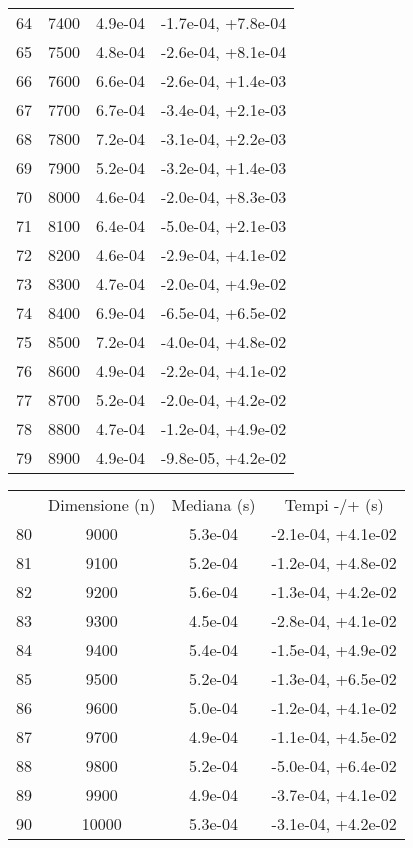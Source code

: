 \begin{table}
\begin{adjustbox}{width=1\textwidth/2}
\begin{tabular}{|c|c|c|c|}
\cline{1-4}
64 & 7400 & 4.9e-04 & -1.7e-04, +7.8e-04 \\
\cline{1-4}
65 & 7500 & 4.8e-04 & -2.6e-04, +8.1e-04 \\
\cline{1-4}
66 & 7600 & 6.6e-04 & -2.6e-04, +1.4e-03 \\
\cline{1-4}
67 & 7700 & 6.7e-04 & -3.4e-04, +2.1e-03 \\
\cline{1-4}
68 & 7800 & 7.2e-04 & -3.1e-04, +2.2e-03 \\
\cline{1-4}
69 & 7900 & 5.2e-04 & -3.2e-04, +1.4e-03 \\
\cline{1-4}
70 & 8000 & 4.6e-04 & -2.0e-04, +8.3e-03 \\
\cline{1-4}
71 & 8100 & 6.4e-04 & -5.0e-04, +2.1e-03 \\
\cline{1-4}
72 & 8200 & 4.6e-04 & -2.9e-04, +4.1e-02 \\
\cline{1-4}
73 & 8300 & 4.7e-04 & -2.0e-04, +4.9e-02 \\
\cline{1-4}
74 & 8400 & 6.9e-04 & -6.5e-04, +6.5e-02 \\
\cline{1-4}
75 & 8500 & 7.2e-04 & -4.0e-04, +4.8e-02 \\
\cline{1-4}
76 & 8600 & 4.9e-04 & -2.2e-04, +4.1e-02 \\
\cline{1-4}
77 & 8700 & 5.2e-04 & -2.0e-04, +4.2e-02 \\
\cline{1-4}
78 & 8800 & 4.7e-04 & -1.2e-04, +4.9e-02 \\
\cline{1-4}
79 & 8900 & 4.9e-04 & -9.8e-05, +4.2e-02 \\
\cline{1-4}
\end{tabular}
\end{adjustbox}
\end{table}

\begin{table}
\centering
\begin{adjustbox}{width=1\textwidth/2}
\begin{tabular}{|c|c|c|c|}
\hline
 & Dimensione (n) & Mediana (s) & Tempi -/+ (s) \\
80 & 9000 & 5.3e-04 & -2.1e-04, +4.1e-02 \\
\cline{1-4}
81 & 9100 & 5.2e-04 & -1.2e-04, +4.8e-02 \\
\cline{1-4}
82 & 9200 & 5.6e-04 & -1.3e-04, +4.2e-02 \\
\cline{1-4}
83 & 9300 & 4.5e-04 & -2.8e-04, +4.1e-02 \\
\cline{1-4}
84 & 9400 & 5.4e-04 & -1.5e-04, +4.9e-02 \\
\cline{1-4}
85 & 9500 & 5.2e-04 & -1.3e-04, +6.5e-02 \\
\cline{1-4}
86 & 9600 & 5.0e-04 & -1.2e-04, +4.1e-02 \\
\cline{1-4}
87 & 9700 & 4.9e-04 & -1.1e-04, +4.5e-02 \\
\cline{1-4}
88 & 9800 & 5.2e-04 & -5.0e-04, +6.4e-02 \\
\cline{1-4}
89 & 9900 & 4.9e-04 & -3.7e-04, +4.1e-02 \\
\cline{1-4}
90 & 10000 & 5.3e-04 & -3.1e-04, +4.2e-02 \\
\cline{1-4}
\end{tabular}
\end{adjustbox}
\end{table}

